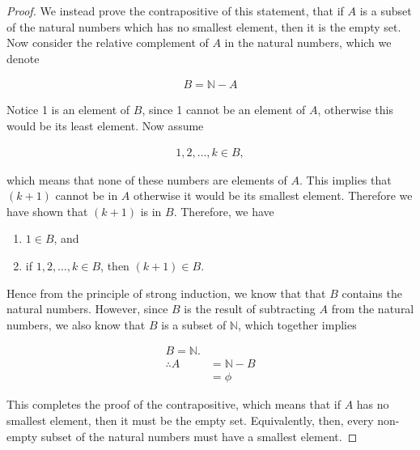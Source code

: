 \documentclass[twoside]{report}
\begin{document}
\begin{proof}
	We instead prove the contrapositive of this statement, that if $A$ is a subset of the natural numbers which has no smallest element, then it is the empty set. Now consider the relative complement of $A$ in the natural numbers, which we denote
	
	\begin{align*}
		B = \mathbb{N} - A
	\end{align*}
	
	Notice 1 is an element of $B$, since 1 cannot be an element of $A$, otherwise this would be its least element. Now assume
	
	\begin{align*}
		1, 2, \dots, k \in B,
	\end{align*}
	
	which means that none of these numbers are elements of $A$. This implies that $(k + 1)$ cannot be in $A$ otherwise it would be its smallest element. Therefore we have shown that $(k + 1)$ is in $B$. Therefore, we have
	
	\vspace{\baselineskip}
	\begin{enumerate}
		\item $1 \in B$, and
		\item if $1, 2, \dots, k \in B$, then $(k + 1) \in B$.
	\end{enumerate}
	\vspace{\baselineskip}
	
	Hence from the principle of strong induction, we know that that $B$ contains the natural numbers. However, since $B$ is the result of subtracting $A$ from the natural numbers, we also know that $B$ is a subset of $\mathbb{N}$, which together implies
	
	\begin{align*}
		B = \mathbb{N}. \\
		\therefore A &= \mathbb{N} - B \\
		&= \phi
	\end{align*}
	
	This completes the proof of the contrapositive, which means that if $A$ has no smallest element, then it must be the empty set. Equivalently, then, every non-empty subset of the natural numbers must have a smallest element. 
\end{proof}
\vspace{\baselineskip}


\end{document}
